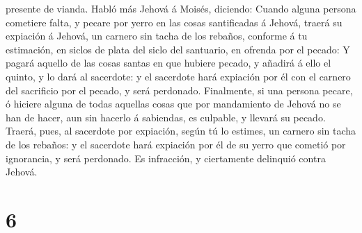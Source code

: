 presente de vianda.  Habló más Jehová á Moisés, diciendo:
 Cuando alguna persona cometiere falta, y pecare por
yerro en las cosas santificadas á Jehová, traerá su expiación á Jehová,
un carnero sin tacha de los rebaños, conforme á tu estimación, en siclos
de plata del siclo del santuario, en ofrenda por el pecado:
 Y pagará aquello de las cosas santas en que hubiere
pecado, y añadirá á ello el quinto, y lo dará al sacerdote: y el
sacerdote hará expiación por él con el carnero del sacrificio por el
pecado, y será perdonado.  Finalmente, si una persona
pecare, ó hiciere alguna de todas aquellas cosas que por mandamiento de
Jehová no se han de hacer, aun sin hacerlo á sabiendas, es culpable, y
llevará su pecado.  Traerá, pues, al sacerdote por
expiación, según tú lo estimes, un carnero sin tacha de los rebaños: y
el sacerdote hará expiación por él de su yerro que cometió por
ignorancia, y será perdonado.  Es infracción, y
ciertamente delinquió contra Jehová.

\hypertarget{section-5}{%
\section{6}\label{section-5}}

